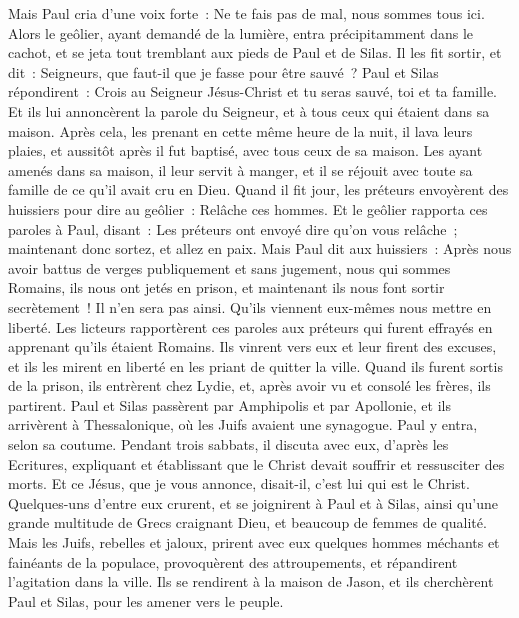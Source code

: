 \begin{multicols}{2}
Mais Paul cria d'une voix forte~: Ne te fais pas de mal, nous sommes tous ici.
Alors le geôlier, ayant demandé de la lumière, entra précipitamment dans le cachot, et se jeta tout tremblant aux pieds de Paul et de Silas.
Il les fit sortir, et dit~: Seigneurs, que faut-il que je fasse pour être sauvé~?
Paul et Silas répondirent~: Crois au Seigneur Jésus-Christ et tu seras sauvé, toi et ta famille.
Et ils lui annoncèrent la parole du Seigneur, et à tous ceux qui étaient dans sa maison.
Après cela, les prenant en cette même heure de la nuit, il lava leurs plaies, et aussitôt après il fut baptisé, avec tous ceux de sa maison.
Les ayant amenés dans sa maison, il leur servit à manger, et il se réjouit avec toute sa famille de ce qu'il avait cru en Dieu.
Quand il fit jour, les préteurs envoyèrent des huissiers pour dire au geôlier~: Relâche ces hommes.
Et le geôlier rapporta ces paroles à Paul, disant~: Les préteurs ont envoyé dire qu'on vous relâche~; maintenant donc sortez, et allez en paix.
Mais Paul dit aux huissiers~: Après nous avoir battus de verges publiquement et sans jugement, nous qui sommes Romains, ils nous ont jetés en prison, et maintenant ils nous font sortir secrètement~! Il n'en sera pas ainsi. Qu'ils viennent eux-mêmes nous mettre en liberté.
Les licteurs rapportèrent ces paroles aux préteurs qui furent effrayés en apprenant qu'ils étaient Romains.
Ils vinrent vers eux et leur firent des excuses, et ils les mirent en liberté en les priant de quitter la ville.
Quand ils furent sortis de la prison, ils entrèrent chez Lydie, et, après avoir vu et consolé les frères, ils partirent.
\VerseOne{}Paul et Silas passèrent par Amphipolis et par Apollonie, et ils arrivèrent à Thessalonique, où les Juifs avaient une synagogue.
Paul y entra, selon sa coutume. Pendant trois sabbats, il discuta avec eux, d'après les Ecritures,
expliquant et établissant que le Christ devait souffrir et ressusciter des morts. Et ce Jésus, que je vous annonce, disait-il, c'est lui qui est le Christ.
Quelques-uns d'entre eux crurent, et se joignirent à Paul et à Silas, ainsi qu'une grande multitude de Grecs craignant Dieu, et beaucoup de femmes de qualité.
Mais les Juifs, rebelles et jaloux, prirent avec eux quelques hommes méchants et fainéants de la populace, provoquèrent des attroupements, et répandirent l'agitation dans la ville. Ils se rendirent à la maison de Jason, et ils cherchèrent Paul et Silas, pour les amener vers le peuple.

\end{multicols}
